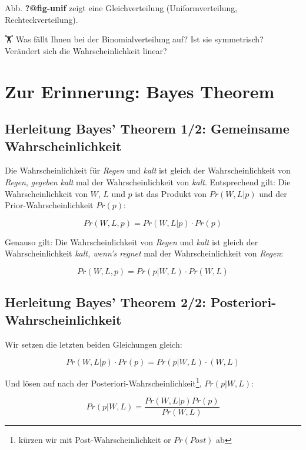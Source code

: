 \documentclass[
  a4paper,
  DIV=11]{scrreprt}
\theoremstyle{definition}
\theoremstyle{remark}
\begin{document}
Abb. \textbf{?@fig-unif} zeigt eine Gleichverteilung (Uniformverteilung,
Rechteckverteilung).

🏋️️ Was fällt Ihnen bei der Binomialverteilung auf? Ist sie symmetrisch?
Verändert sich die Wahrscheinlichkeit linear?

\hypertarget{zur-erinnerung-bayes-theorem}{%
\section{Zur Erinnerung: Bayes
Theorem}\label{zur-erinnerung-bayes-theorem}}

\hypertarget{herleitung-bayes-theorem-12-gemeinsame-wahrscheinlichkeit}{%
\subsection{Herleitung Bayes' Theorem 1/2: Gemeinsame
Wahrscheinlichkeit}\label{herleitung-bayes-theorem-12-gemeinsame-wahrscheinlichkeit}}

Die Wahrscheinlichkeit für \emph{Regen} und \emph{kalt} ist gleich der
Wahrscheinlichkeit von \emph{Regen}, \emph{gegeben kalt} mal der
Wahrscheinlichkeit von \emph{kalt}. Entsprechend gilt: Die
Wahrscheinlichkeit von \(W\), \(L\) und \(p\) ist das Produkt von
\(Pr(W,L|p)\) und der Prior-Wahrscheinlichkeit \(Pr(p)\):

\[Pr(W,L,p) = Pr(W,L|p) \cdot Pr(p)\]

Genauso gilt: Die Wahrscheinlichkeit von \emph{Regen} und \emph{kalt}
ist gleich der Wahrscheinlichkeit \emph{kalt, wenn's regnet} mal der
Wahrscheinlichkeit von \emph{Regen}:

\[Pr(W,L,p) = Pr(p|W,L) \cdot Pr(W, L)\]

\hypertarget{herleitung-bayes-theorem-22-posteriori-wahrscheinlichkeit}{%
\subsection{Herleitung Bayes' Theorem 2/2:
Posteriori-Wahrscheinlichkeit}\label{herleitung-bayes-theorem-22-posteriori-wahrscheinlichkeit}}

Wir setzen die letzten beiden Gleichungen gleich:

\[Pr(W,L|p) \cdot Pr(p) = Pr(p|W,L) \cdot (W,L)\]

Und lösen auf nach der Posteriori-Wahrscheinlichkeit\footnote{kürzen wir
  mit Post-Wahrscheinlichkeit or \(Pr(Post)\) ab}, \(Pr(p|W,L)\):

\[Pr(p|W,L) = \frac{Pr(W,L|p) Pr(p)}{Pr(W,L)}\]
\end{document}
